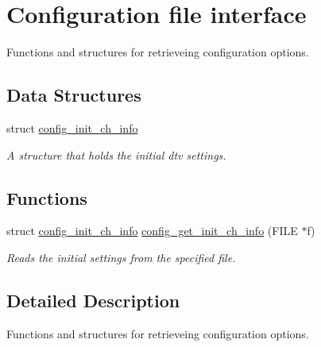 \hypertarget{group__config}{}\section{Configuration file interface}
\label{group__config}


Functions and structures for retrieveing configuration options.  


\subsection*{Data Structures}
\begin{DoxyCompactItemize}
\item 
struct \hyperlink{structconfig__init__ch__info}{config\+\_\+init\+\_\+ch\+\_\+info}
\begin{DoxyCompactList}\small\item\em A structure that holds the initial dtv settings. \end{DoxyCompactList}\end{DoxyCompactItemize}
\subsection*{Functions}
\begin{DoxyCompactItemize}
\item 
struct \hyperlink{structconfig__init__ch__info}{config\+\_\+init\+\_\+ch\+\_\+info} \hyperlink{group__config_gad7d820530151b1bb2b6cf6e992f48331}{config\+\_\+get\+\_\+init\+\_\+ch\+\_\+info} (F\+I\+LE $\ast$f)\hypertarget{group__config_gad7d820530151b1bb2b6cf6e992f48331}{}\label{group__config_gad7d820530151b1bb2b6cf6e992f48331}

\begin{DoxyCompactList}\small\item\em Reads the initial settings from the specified file. \end{DoxyCompactList}\end{DoxyCompactItemize}


\subsection{Detailed Description}
Functions and structures for retrieveing configuration options. 


